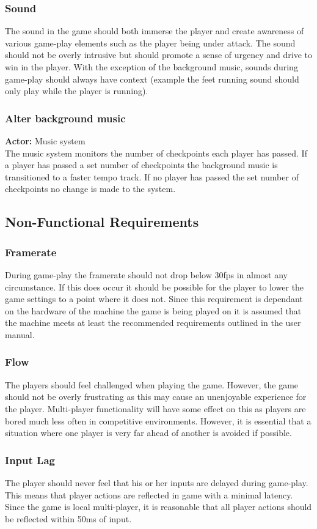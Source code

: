 \documentclass[11pt,a4paper]{article}
\begin{document}
\subsubsection{Sound}
The sound in the game should both immerse the player and create awareness of various game-play elements such as the player being under attack. The sound should not be overly intrusive but should promote a sense of urgency and drive to win in the player. With the exception of the background music, sounds during game-play should always have context (example the feet running sound should only play while the player is running).

\subsubsection{Alter background music}
\textbf{Actor:} Music system\smallskip\\
The music system monitors the number of checkpoints each player has passed. If a player has passed a set number of checkpoints the background music is transitioned to a faster tempo track.
If no player has passed the set number of checkpoints no change is made to the system.
\subsection{Non-Functional Requirements}
\subsubsection{Framerate}
During game-play the framerate should not drop below 30fps in almost any circumstance. If this does occur it should be possible for the player to lower the game settings to a point where it does not. Since this requirement is dependant on the hardware of the machine the game is being played on it is assumed that the machine meets at least the recommended requirements outlined in the user manual.
\subsubsection{Flow}
The players should feel challenged when playing the game. However, the game should not be overly frustrating as this may cause an unenjoyable experience for the player. Multi-player functionality will have some effect on this as players are bored much less often in competitive environments. However, it is essential that a situation where one player is very far ahead of another is avoided if possible.
\subsubsection{Input Lag}
The player should never feel that his or her inputs are delayed during game-play. This means that player actions are reflected in game with a minimal latency. Since the game is local multi-player, it is reasonable that all player actions should be reflected within 50ms of input.
\end{document}
